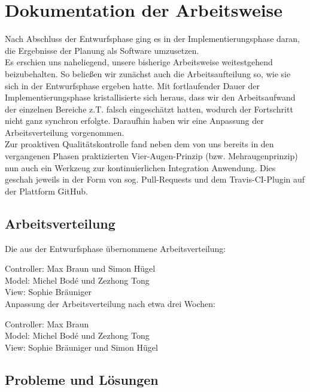 \section{Dokumentation der Arbeitsweise}

Nach Abschluss der Entwurfsphase ging es in der Implementierungsphase daran, die Ergebnisse der Planung als Software umzusetzen.\\
Es erschien uns naheliegend, unsere bisherige Arbeitsweise weitestgehend beizubehalten. So beließen wir zunächst auch die Arbeitsaufteilung so, wie sie sich in der Entwurfsphase ergeben hatte. Mit fortlaufender Dauer der Implementierungsphase kristallisierte sich heraus, dass wir den Arbeitsaufwand der einzelnen Bereiche z.T. falsch eingeschätzt hatten, wodurch der Fortschritt nicht ganz synchron erfolgte. Daraufhin haben wir eine Anpassung der Arbeitsverteilung vorgenommen.\\
Zur proaktiven Qualitätskontrolle fand neben dem von uns bereits in den vergangenen Phasen praktizierten Vier-Augen-Prinzip (bzw. Mehraugenprinzip) nun auch ein Werkzeug zur kontinuierlichen Integration Anwendung. Dies geschah jeweils in der Form von sog. Pull-Requests und dem Travis-CI-Plugin auf der Plattform GitHub.

\subsection{Arbeitsverteilung}

Die aus der Entwurfsphase übernommene Arbeitsverteilung:

Controller: Max Braun und Simon Hügel\\
Model: Michel Bodé und Zezhong Tong\\
View: Sophie Bräuniger\\

Anpassung der Arbeitsverteilung nach etwa drei Wochen:

Controller: Max Braun\\
Model: Michel Bodé und Zezhong Tong\\
View: Sophie Bräuniger und Simon Hügel\\

\subsection{Probleme und Lösungen}

